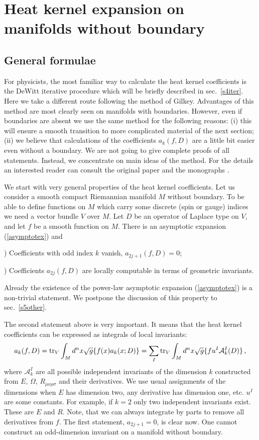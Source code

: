 \section{Heat kernel expansion on manifolds without boundary}
\label{sec4}
\subsection{General formulae}\label{s4gen}
For physicists, the most familiar way to calculate the heat
kernel coefficients is the DeWitt iterative procedure which
will be briefly described in sec.\ \ref{s4iter}. Here
we take a different route following the method of Gilkey.
Advantages of this method are most clearly seen on manifolds
with boundaries. However, even if boundaries are absent
we use the same method for the following reasons:
(i) this will ensure a smooth transition to more
complicated material of the next section; (ii) we believe
that calculations of the coefficients $a_k(f,D)$ are a little
bit easier even without a boundary.
We are not going
to give complete proofs of all statements. Instead,
we concentrate on main ideas of the method. 
For the details an interested reader
can consult the original paper \cite{Gilkey1975}
and the monographs \cite{Gilkey:1995,Kirsten:2001wz}.

We start with very general properties of the heat
kernel coefficients. Let us consider 
a smooth compact Riemannian manifold $M$ without boundary.
To be able to define functions on $M$ which carry some discrete
(spin or gauge) indices  we need a vector bundle $V$ over $M$.
Let $D$ be an operator of Laplace type on $V$, 
and let $f$ be a smooth function on $M$.
There is an asymptotic expansion (\ref{asymptotex}) and

) Coefficients with odd index $k$ vanish,
$a_{2j+1}(f,D)=0$;

) Coefficients $a_{2j}(f,D)$ are locally
computable in terms of geometric invariants.

Already the existence of the power-law asymptotic expansion (\ref{asymptotex})
is a non-trivial statement. We postpone the discussion of this 
property to sec.\ \ref{s5other}.

The second statement above is very
important. It means that the heat kernel coefficients
can be expressed as integrals of local invariants:
\begin{equation}
a_k(f,D)= {\rm tr}_V \int_M d^nx\sqrt{g} \{ f(x) a_k (x;D) \} 
=\sum_I {\rm tr}_V \int_M d^nx\sqrt{g} \{ f u^I \mathcal{ A}_k^I(D) \} \,, \label{locinv}
\end{equation}
where $\mathcal{ A}_k^I$ are all possible independent invariants 
of the dimension $k$  constructed
from $E$, $\Omega$, $R_{\mu\nu\rho\sigma}$ and their derivatives.
We use usual assignments of the dimensions
when $E$ has dimension two, any derivative has dimension one, etc.
 $u^I$ are some constants. For example, if $k=2$ only two 
independent invariants exist. These are $E$ and $R$.
Note, that we can
always integrate by parts to remove all derivatives from $f$.
The first statement, $a_{2j+1}=0$, is clear now. 
One cannot construct an
odd-dimension invariant on a manifold without boundary.

